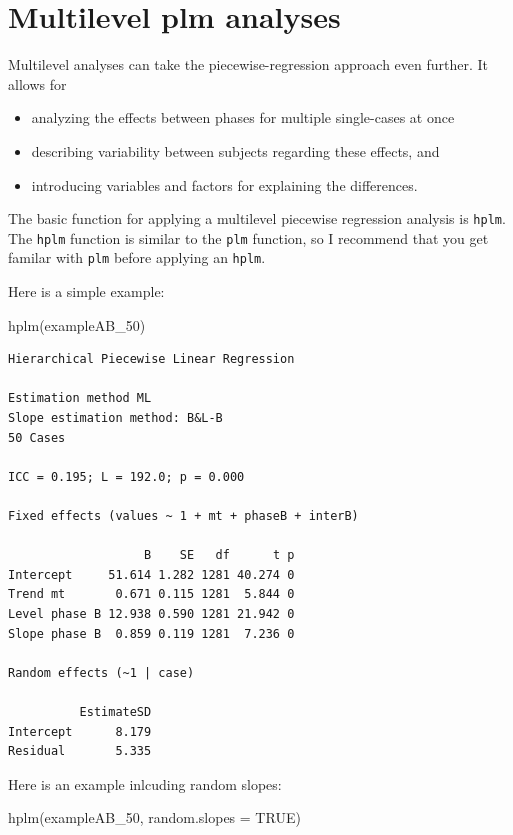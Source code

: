 \documentclass[
]{book}
\newenvironment{Shaded}{\begin{snugshade}}{\end{snugshade}}
\newcommand{\AttributeTok}[1]{\textcolor[rgb]{0.77,0.63,0.00}{#1}}
\newcommand{\ConstantTok}[1]{\textcolor[rgb]{0.00,0.00,0.00}{#1}}
\newcommand{\FunctionTok}[1]{\textcolor[rgb]{0.00,0.00,0.00}{#1}}
\newcommand{\NormalTok}[1]{#1}
\providecommand{\tightlist}{%
  \setlength{\itemsep}{0pt}\setlength{\parskip}{0pt}}
\begin{document}
\hypertarget{multilevel-plm-analyses}{%
\section{Multilevel plm analyses}\label{multilevel-plm-analyses}}

Multilevel analyses can take the piecewise-regression approach even further. It allows for

\begin{itemize}
\tightlist
\item
  analyzing the effects between phases for multiple single-cases at once
\item
  describing variability between subjects regarding these effects, and
\item
  introducing variables and factors for explaining the differences.
\end{itemize}

The basic function for applying a multilevel piecewise regression analysis is \texttt{hplm}. The \texttt{hplm} function is similar to the \texttt{plm} function, so I recommend that you get familar with \texttt{plm} before applying an \texttt{hplm}.

Here is a simple example:

\begin{Shaded}
\begin{Highlighting}[]
\FunctionTok{hplm}\NormalTok{(exampleAB\_50)}
\end{Highlighting}
\end{Shaded}

\begin{verbatim}
Hierarchical Piecewise Linear Regression

Estimation method ML 
Slope estimation method: B&L-B 
50 Cases

ICC = 0.195; L = 192.0; p = 0.000

Fixed effects (values ~ 1 + mt + phaseB + interB)

                   B    SE   df      t p
Intercept     51.614 1.282 1281 40.274 0
Trend mt       0.671 0.115 1281  5.844 0
Level phase B 12.938 0.590 1281 21.942 0
Slope phase B  0.859 0.119 1281  7.236 0

Random effects (~1 | case)

          EstimateSD
Intercept      8.179
Residual       5.335
\end{verbatim}

Here is an example inlcuding random slopes:

\begin{Shaded}
\begin{Highlighting}[]
\FunctionTok{hplm}\NormalTok{(exampleAB\_50, }\AttributeTok{random.slopes =} \ConstantTok{TRUE}\NormalTok{)}
\end{Highlighting}
\end{Shaded}
\end{document}
